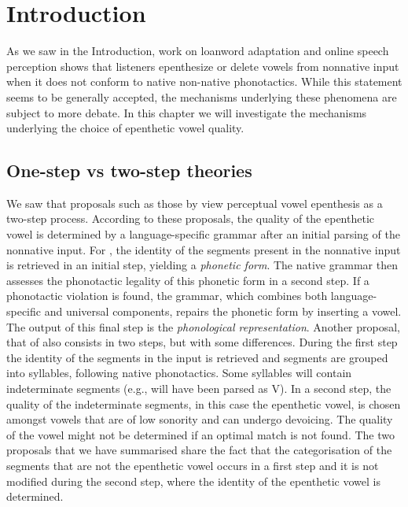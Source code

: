 


\section{Introduction}
As we saw in the Introduction, work on loanword adaptation and online speech perception shows that listeners epenthesize or delete vowels from nonnative input when it does not conform to native non-native phonotactics.
While this statement seems to be generally accepted, the mechanisms underlying these phenomena are subject to more debate. In this chapter we will investigate the mechanisms underlying the choice of epenthetic vowel quality. 


\subsection{One-step vs two-step theories}
We saw that proposals such as those by \cite{berent2007, monahan2009} view perceptual vowel epenthesis as a two-step process.
According to these proposals, the quality of the epenthetic vowel is determined by a language-specific grammar after an initial parsing of the nonnative input.
For \cite{berent2007}, the identity of the segments present in the nonnative input is retrieved in an initial step, yielding a \textit{phonetic form}. The native grammar then assesses the phonotactic legality of this phonetic form in a second step. If a phonotactic violation is found, the grammar, which combines both language-specific and universal components, repairs the phonetic form by inserting a vowel. The output of this final step is the \textit{phonological representation}.
Another proposal, that of \cite{monahan2009} also consists in two steps, but with some differences. During the first step the identity of the segments in the input is retrieved and segments are grouped into syllables, following native phonotactics. Some syllables will contain indeterminate segments (e.g.,  will have been parsed as V). In a second step, the quality of the indeterminate segments, in this case the epenthetic vowel, is chosen amongst vowels that are of low sonority and can undergo devoicing. The quality of the vowel might not be determined if an optimal match is not found.
The two proposals that we have summarised share the fact that the categorisation of the segments that are not the epenthetic vowel occurs in a first step and it is not modified during the second step, where the identity of the epenthetic vowel is determined.

